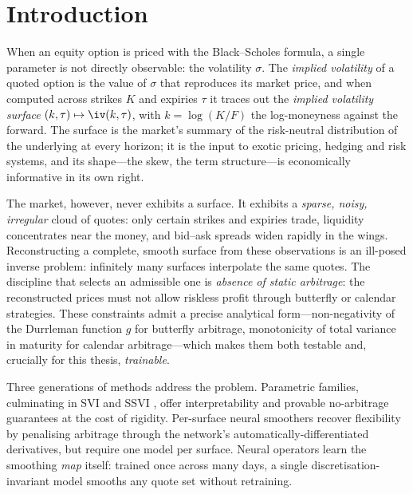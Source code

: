 \chapter*{Introduction}

When an equity option is priced with the Black--Scholes formula, a single parameter is not directly observable: the volatility $\sigma$. The \emph{implied volatility} of a quoted option is the value of $\sigma$ that reproduces its market price, and when computed across strikes $K$ and expiries $\tau$ it traces out the \emph{implied volatility surface} $(k,\tau)\mapsto \iv(k,\tau)$, with $k=\log(K/F)$ the log-moneyness against the forward. The surface is the market's summary of the risk-neutral distribution of the underlying at every horizon; it is the input to exotic pricing, hedging and risk systems, and its shape---the skew, the term structure---is economically informative in its own right.

The market, however, never exhibits a surface. It exhibits a \emph{sparse, noisy, irregular} cloud of quotes: only certain strikes and expiries trade, liquidity concentrates near the money, and bid--ask spreads widen rapidly in the wings. Reconstructing a complete, smooth surface from these observations is an ill-posed inverse problem: infinitely many surfaces interpolate the same quotes. The discipline that selects an admissible one is \emph{absence of static arbitrage}: the reconstructed prices must not allow riskless profit through butterfly or calendar strategies. These constraints admit a precise analytical form---non-negativity of the Durrleman function $g$ for butterfly arbitrage, monotonicity of total variance in maturity for calendar arbitrage---which makes them both testable and, crucially for this thesis, \emph{trainable}.

Three generations of methods address the problem. Parametric families, culminating in SVI and SSVI \cite{gatheral2014arbitrage}, offer interpretability and provable no-arbitrage guarantees at the cost of rigidity. Per-surface neural smoothers \cite{ackerer2020deep, chataigner2020deep, hoshisashi2024noarbitrage} recover flexibility by penalising arbitrage through the network's automatically-differentiated derivatives, but require one model per surface. Neural operators \cite{gonon2024operator} learn the smoothing \emph{map} itself: trained once across many days, a single discretisation-invariant model smooths any quote set without retraining.

